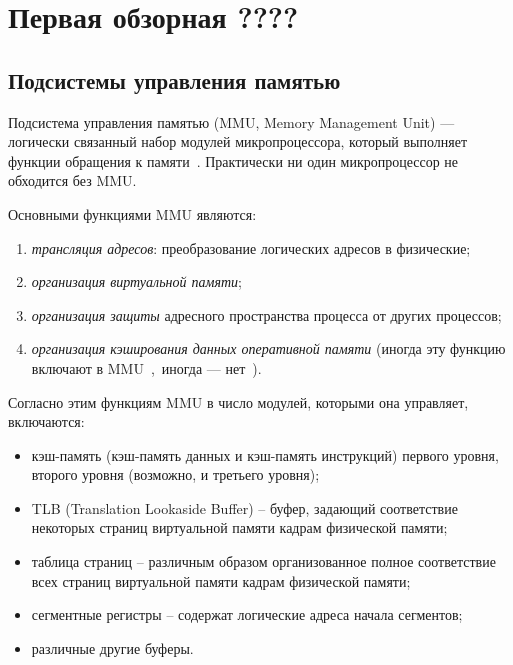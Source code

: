 \documentclass[14pt]{extreport}
\newcommand{\LRU}{\textsf{LRU}\xspace}
\newcommand{\FIFO}{\textsf{FIFO}\xspace}
\newcommand{\PseudoLRU}{\textsf{Pseudo-LRU}\xspace}
\begin{document}
\chapter{Первая обзорная ????}

\section{Подсистемы управления памятью}

Подсистема управления памятью (MMU, Memory Management Unit) ---
логически связанный набор модулей микропроцессора, который выполняет
функции обращения к памяти~\cite{MMU}. Практически ни один
микропроцессор не обходится без MMU.

Основными функциями MMU являются:
\begin{enumerate}
  \item \emph{трансляция адресов}: преобразование логических адресов
  в физические;
  \item \emph{организация виртуальной памяти};
  \item \emph{организация защиты} адресного пространства процесса от
  других процессов;
  \item \emph{организация кэширования данных оперативной памяти}
  (иногда эту функцию включают в MMU~\cite{vorobyev},~иногда ---
  нет~\cite{thompson}).
\end{enumerate}

Согласно этим функциям MMU в число модулей, которыми она управляет, включаются:
\begin{itemize}
  \item кэш-память (кэш-память данных и кэш-память инструкций)
  первого уровня, второго уровня (возможно, и третьего уровня);
  \item TLB (Translation Lookaside Buffer) -- буфер, задающий
  соответствие некоторых страниц виртуальной памяти кадрам
  физической памяти;
  \item таблица страниц -- различным образом организованное полное
  соответствие всех страниц виртуальной памяти кадрам физической
  памяти;
  \item сегментные регистры -- содержат логические адреса начала сегментов;
  \item различные другие буферы.
\end{itemize}

\end{document}
